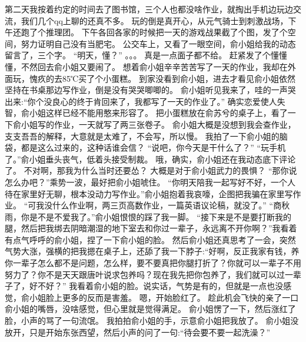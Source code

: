 第二天我按着约定的时间去了图书馆，三个人也都没啥作业，就掏出手机边玩边交流，我们几个qq上聊的还真不多。
玩的倒是真开心，从元气骑士到刺激战场，下午还跑了个推理团。
下午各回各家的时候把一天的游戏战果截了个图，发了个空间，努力证明自己没有当肥宅。
公交车上，又看了一眼空间，俞小姐给我的动态留言了，三个字。
“明天，懂？”
。。。
真是一点面子都不给。
赶紧发了个懂懂懂，不然回去俞小姐又要闹了。
想着俞小姐辛辛苦苦写了一天的作业，我却在外面玩，愧疚的去85℃买了个小蛋糕。
到家没看到俞小姐，进去才看见俞小姐依然坚持在书桌那边写作业，倒是没有哭哭唧唧的。
俞小姐听见我来了，哇的一声哭出来:“你个没良心的终于肯回来了，我都写了一天的作业了。”
确实恋爱使人失智，俞小姐这样已经不能用憨来形容了。
把小蛋糕放在俞苏兮的桌子上，看了一下俞小姐写的作业，一天就写了两三张卷子。
俞小姐大概是没想到我会查作业，支支吾吾的解释，大意就是太难了，不会写，所以慢。
我拍了一下俞小姐的脑袋，都是这么过来的，这种话谁会信？
“说吧，你今天是干什么了？”
“玩手机了。”俞小姐垂头丧气，低着头接受制裁。
哦，确实，俞小姐还在我动态底下评论了。
不对啊，那我为什么当时还要怂？
大概是对于俞小姐武力的畏惧？
“那你说怎么办吧？”乘势一波，最好把俞小姐唬住。
“你明天陪我一起写好不好，一个人待在家里好无聊，根本没动力写作业。”俞小姐抱着我哀嚎，企图把我骗在家里写作业。
“可我没什么作业啊，两三页高数作业，一篇英语议论稿，就没了。”
“商秋雨，你是不是不爱我了。”俞小姐恨恨的踩了我一脚。
“接下来是不是要打断我的腿，然后把我绑去阴暗潮湿的地下室去和你过一辈子，永远离不开你啊？”我看着有点气呼呼的俞小姐，捏了一下俞小姐的脸。
然后俞小姐还真思考了一会，突然气势大涨，强横的把我摁在桌子上，还舔了我一下脖子:“好啊，反正我家有钱，养你一辈子怎么都不是问题，怎么样，要不要真把你腿打折了？你就可以一辈子不用努力了？你不是天天跟唐叶说求包养吗？现在我先把你包养了，我们就可以过一辈子了，好不好？”
我看着俞小姐的脸。说实话，气势是有的，但就是一点也没感觉，俞小姐脸上更多的反而是害羞。
嗯，开始脸红了。
趁此机会飞快的亲了一口俞小姐的嘴唇，没啥感觉，但心里就是觉得满足。
俞小姐愣了一下，然后涨红了脸，小声的骂了一句流氓。
我拍拍俞小姐的手，示意俞小姐把我放了。
俞小姐没放开，只是开始东张西望，然后小声的问了一句:“待会要不要一起洗澡？”

